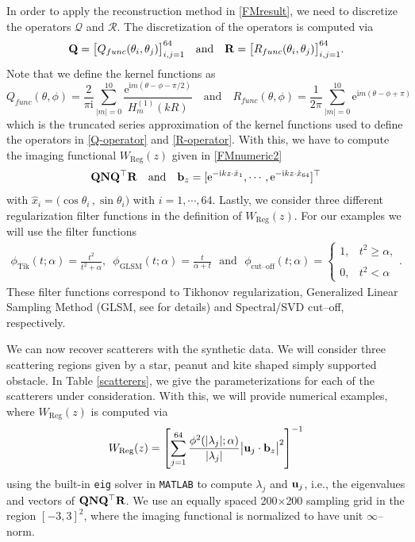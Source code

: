 \documentclass{article}
\numberwithin{equation}{section}
\begin{document}
{In order to apply the reconstruction method in \eqref{FMresult}, we need to discretize the operators $\mathcal{Q}$ and $\mathcal{R}$. The discretization of the operators is computed via 
$$ {\bf Q} = \big[ Q_{func} (\theta_{i} , \theta_{j}) \big]_{i,j = 1}^{64} \quad \text{and} \quad {\bf R} = \big[ R_{func} (\theta_{i} , \theta_{j}) \big]_{i,j = 1}^{64}.$$
Note that we define the kernel functions as 
$$Q_{func} (\theta, \phi) = \frac{ 2 }{\pi \text{i}} \sum_{|m| = 0}^{10} \frac{\text{e}^{\text{i}m(\theta - \phi - \pi/2)}}{H^{(1)}_{m}(kR)}  \quad \text{and} \quad R_{func}(\theta, \phi) = \frac{1}{2\pi} \sum_{|m| = 0}^{10} \text{e}^{\text{i}m(\theta - \phi + \pi)}$$
which is the truncated series approximation of the kernel functions used to define the operators in \eqref{Q-operator} and \eqref{R-operator}. With this, we have to compute the imaging functional $W_{\text{Reg}}(z)$ given in \eqref{FMnumeric2} 
$$ {\bf Q} {\bf N} {\bf Q}^\top {\bf R}  \quad \text{and} \quad {\bf b}_z =[ \text{e}^{-\text{i}k z \cdot \hat{x}_1} , \cdots , \text{e}^{-\text{i}k z \cdot \hat{x}_{64}} ]^\top $$
with $\hat{x}_{i} = \big( \cos \theta_{i} \, , \sin \theta_{i} \big)$ with $i=1, \cdots, 64$. Lastly, we consider three different regularization filter functions in the definition of $W_{\text{Reg}}(z)$. For our examples we will use the filter functions 
\begin{align}\label{filters}
 \phi_{\text{Tik}}(t ; \alpha) =  \frac{t^2}{t^2+\alpha}, \,\, \,  \phi_{\text{GLSM}}(t ; \alpha) = \frac{t}{\alpha + t} \,\, \textrm{ and } \,\,  \displaystyle{  \phi_{\text{cut--off}}(t ; \alpha)= \left\{\begin{array}{lr} 1, &  t^2\geq \alpha,  \\
 				&  \\
 0,&  t^2 < \alpha
 \end{array} \right.}  .
\end{align}
These filter functions correspond to Tikhonov regularization, Generalized Linear Sampling Method (GLSM, see \cite{GLSM} for details) and Spectral/SVD cut--off, respectively. 

We can now recover scatterers with the synthetic data. We will consider three scattering regions given by a star, peanut and kite shaped simply supported obstacle. In Table \ref{scatterers}, we give the parameterizations for each of the scatterers under consideration. With this, we will provide numerical examples, where $W_{\text{Reg}}(z)$ is computed via 
$$W_{\text{Reg}}(z)= \left[ \sum\limits_{j=1}^{64} \frac{\phi^2( | \lambda_j  | ; \alpha)}{ | \lambda_j | } \big|{\bf u}_j \cdot {\bf b}_z \big|^2 \right]^{-1}$$
using the built-in \texttt{eig} solver in \texttt{MATLAB} to compute $\lambda_j$ and ${\bf u}_j$, i.e., the eigenvalues and vectors of $ {\bf Q} {\bf N} {\bf Q}^\top {\bf R}$. We use an equally spaced 200$\times$200 sampling grid in the region $[-3,3]^2$, where the imaging functional is normalized to have unit $\infty$--norm. 

}
\end{document}
